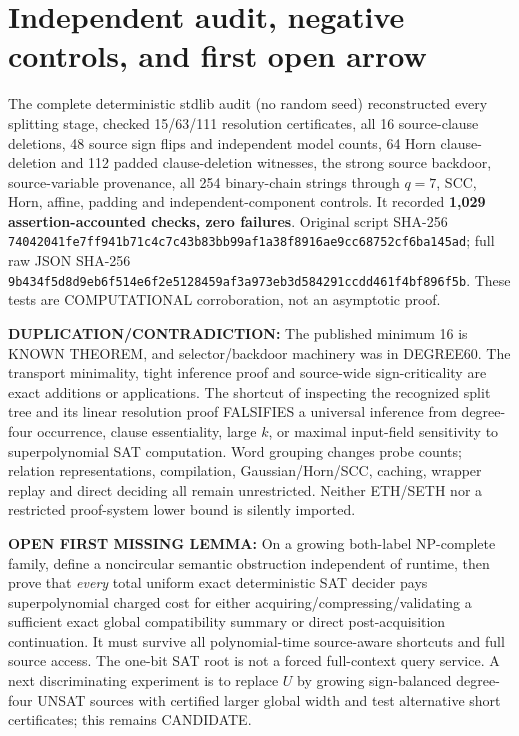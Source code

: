 \documentclass[11pt]{article}
\begin{document}
\section{Independent audit, negative controls, and first open arrow}
The complete deterministic stdlib audit (no random seed) reconstructed every splitting stage, checked 15/63/111 resolution certificates, all 16 source-clause deletions, 48 source sign flips and independent model counts, 64 Horn clause-deletion and 112 padded clause-deletion witnesses, the strong source backdoor, source-variable provenance, all 254 binary-chain strings through $q=7$, SCC, Horn, affine, padding and independent-component controls. It recorded \textbf{1,029 assertion-accounted checks, zero failures}. Original script SHA-256 \texttt{74042041fe7ff941b71c4c7c43b83bb99af1a38f8916ae9cc68752cf6ba145ad}; full raw JSON SHA-256 \texttt{9b434f5d8d9eb6f514e6f2e5128459af3a973eb3d584291ccdd461f4bf896f5b}. These tests are COMPUTATIONAL corroboration, not an asymptotic proof.

\noindent\textbf{DUPLICATION/CONTRADICTION:} The published minimum 16 is KNOWN THEOREM, and selector/backdoor machinery was in DEGREE60. The transport minimality, tight inference proof and source-wide sign-criticality are exact additions or applications. The shortcut of inspecting the recognized split tree and its linear resolution proof FALSIFIES a universal inference from degree-four occurrence, clause essentiality, large $k$, or maximal input-field sensitivity to superpolynomial SAT computation. Word grouping changes probe counts; relation representations, compilation, Gaussian/Horn/SCC, caching, wrapper replay and direct deciding all remain unrestricted. Neither ETH/SETH nor a restricted proof-system lower bound is silently imported.

\noindent\textbf{OPEN FIRST MISSING LEMMA:} On a growing both-label NP-complete family, define a noncircular semantic obstruction independent of runtime, then prove that \emph{every} total uniform exact deterministic SAT decider pays superpolynomial charged cost for either acquiring/compressing/validating a sufficient exact global compatibility summary or direct post-acquisition continuation. It must survive all polynomial-time source-aware shortcuts and full source access. The one-bit SAT root is not a forced full-context query service. A next discriminating experiment is to replace $U$ by growing sign-balanced degree-four UNSAT sources with certified larger global width and test alternative short certificates; this remains CANDIDATE.
\end{document}
